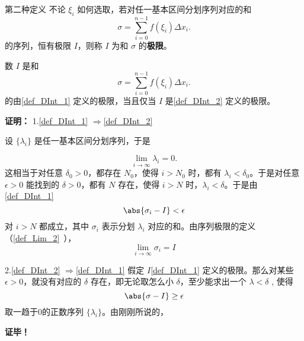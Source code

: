 \begin{definition}{第二种定义}
不论 $\xi_i$ 如何选取，若对任一基本区间分划序列对应的和 
\begin{equation}
\sigma=\sum_{i=0}^{n-1}f(\xi_i)\Delta x_i.
\end{equation}
的序列，恒有极限 $I$，则称 $I$ 为和 $\sigma$ 的\textbf{极限}。
\end{definition}
\begin{theorem}{}
数 $I$ 是和 
\begin{equation}
\sigma=\sum_{i=0}^{n-1}f(\xi_i)\Delta x_i.
\end{equation}
的由\autoref{def_DInt_1} 定义的极限，当且仅当 $I$ 是\autoref{def_DInt_2} 定义的极限。
\end{theorem}
\textbf{证明：}
1.\autoref{def_DInt_1} $\Rightarrow$\autoref{def_DInt_2} 

设 $\{\lambda_i\}$ 是任一基本区间分划序列，于是 

\begin{equation}
\lim\limits_{i\rightarrow\infty}\lambda_i=0.
\end{equation}
这相当于对任意 $\delta_0>0$，都存在 $N_0$，使得 $i>N_0$ 时，都有 $\lambda_i<\delta_0$。于是对任意 $\epsilon>0$ 能找到的 $\delta>0$，都有 $N$ 存在，使得 $i>N$ 时，$\lambda_i<\delta$。于是由\autoref{def_DInt_1} 
\begin{equation}
\abs{\sigma_i-I}<\epsilon
\end{equation}
对 $i>N$ 都成立，其中 $\sigma_i$ 表示分划 $\lambda_i$ 对应的和。由序列极限的定义（\autoref{def_Lim_2}~），
\begin{equation}
\lim_{i\rightarrow\infty} \sigma_i=I
\end{equation}

2.\autoref{def_DInt_2} $\Rightarrow$\autoref{def_DInt_1} 
假定 $I$\autoref{def_DInt_1} 定义的极限。那么对某些 $\epsilon>0$，就没有对应的 $\delta$ 存在，即无论取怎么小 $\delta$，至少能求出一个 $\lambda<\delta$ , 使得
\begin{equation}
\abs{\sigma-I}\geq\epsilon
\end{equation}
取一趋于0的正数序列 $\{\lambda_i\}$。由刚刚所说的，

\textbf{证毕！}
